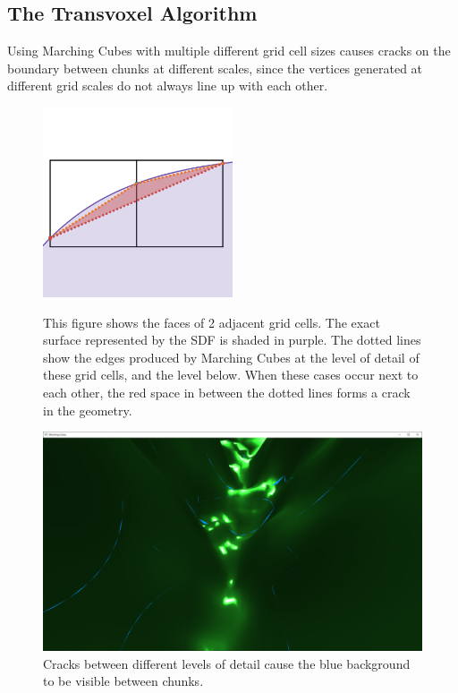 \documentclass[11pt]{article}
\begin{document}
\subsection{The Transvoxel Algorithm}
\label{section:cracks}
Using Marching Cubes with multiple different grid cell sizes causes cracks on the boundary between chunks at different scales, since the vertices generated at different grid scales do not always line up with each other.

\begin{figure}
  \caption{This figure shows the faces of 2 adjacent grid cells. The exact surface represented by the SDF is shaded in purple. The dotted lines show the edges produced by Marching Cubes at the level of detail of these grid cells, and the level below. When these cases occur next to each other, the red space in between the dotted lines forms a crack in the geometry.}
  \includegraphics[width=0.5\textwidth]{cracks_demo.png}
  \label{fig:cracks_demo}
\end{figure}

\begin{figure}[H]
  \includegraphics[width=\textwidth]{cracks2.png}
  \caption{Cracks between different levels of detail cause the blue background to be visible between chunks.}
  \label{fig:cracks2}
\end{figure}
\end{document}
